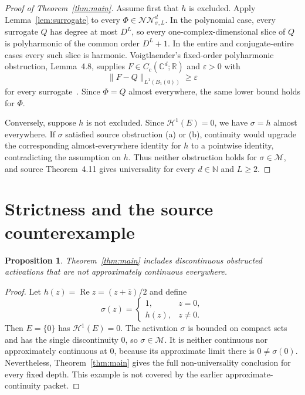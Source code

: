 \documentclass[11pt]{article}
\newtheorem{proposition}[theorem]{Proposition}
\theoremstyle{remark}
\newcommand{\C}{\mathbb C}
\newcommand{\R}{\mathbb R}
\newcommand{\N}{\mathbb N}
\newcommand{\M}{\mathcal M}
\newcommand{\NN}{\mathcal{NN}}
\newcommand{\HH}{\mathcal H}
\begin{document}
\begin{proof}[Proof of Theorem~\ref{thm:main}]
Assume first that $h$ is excluded.  Apply Lemma~\ref{lem:surrogate} to every
$\Phi\in\NN^d_{\sigma,L}$.  In the polynomial case, every surrogate $Q$
has degree at most $D^L$, so every one-complex-dimensional slice of $Q$ is
polyharmonic of the common order $D^L+1$.  In the entire and
conjugate-entire cases every such slice is harmonic.  Voigtlaender's
fixed-order polyharmonic obstruction, Lemma~4.8, supplies
$F\in C_c(\C^d;\R)$ and $\varepsilon>0$ with
\[
 \|F-Q\|_{L^1(B_1(0))}\ge\varepsilon
\]
for every surrogate~\cite{source}.  Since $\Phi=Q$ almost everywhere, the
same lower bound holds for $\Phi$.

Conversely, suppose $h$ is not excluded.  Since $\HH^1(E)=0$, we have
$\sigma=h$ almost everywhere.  If $\sigma$ satisfied source obstruction
(a) or (b), continuity would upgrade the corresponding almost-everywhere
identity for $h$ to a pointwise identity, contradicting the assumption on
$h$.  Thus neither obstruction holds for $\sigma\in\M$, and source
Theorem~4.11 gives universality for every $d\in\N$ and $L\ge2$.
\end{proof}

\section{Strictness and the source counterexample}

\begin{proposition}
Theorem~\ref{thm:main} includes discontinuous obstructed activations that are
not approximately continuous everywhere.
\end{proposition}

\begin{proof}
Let $h(z)=\operatorname{Re}z=(z+\overline z)/2$ and define
\[
 \sigma(z)=\begin{cases}1,&z=0,\\h(z),&z\ne0.\end{cases}
\]
Then $E=\{0\}$ has $\HH^1(E)=0$.  The activation $\sigma$ is bounded on
compact sets and has the single discontinuity $0$, so $\sigma\in\M$.
It is neither continuous nor approximately continuous at $0$, because its
approximate limit there is $0\ne\sigma(0)$.  Nevertheless,
Theorem~\ref{thm:main} gives the full non-universality conclusion for every
fixed depth.  This example is not covered by the earlier
approximate-continuity packet.
\end{proof}
\end{document}
